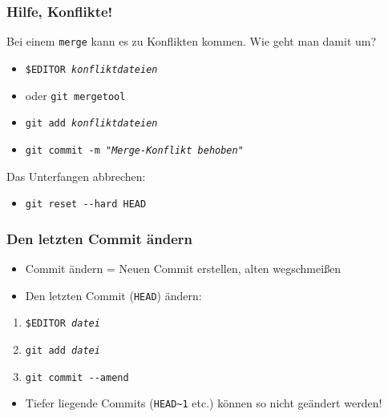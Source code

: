 \documentclass{beamer}
\begin{document}
\begin{frame}
\frametitle{Hilfe, Konflikte!}



Bei einem \texttt{merge} kann es zu Konflikten kommen. Wie geht man damit um?
\begin{itemize}
	\item \texttt{\$EDITOR \emph{konfliktdateien}}
	\item[]{ oder \texttt{git mergetool} }
	\item \texttt{git add \emph{konfliktdateien}}
	\item \texttt{git commit -m "\emph{Merge-Konflikt behoben}"}
\end{itemize}


\vspace{.5em}

Das Unterfangen abbrechen:
\begin{itemize}
	\item \texttt{git reset -{}-hard HEAD}
\end{itemize}

\end{frame}

\begin{frame}

	\frametitle{Den letzten Commit ändern}
\begin{itemize}
	\item Commit ändern = Neuen Commit erstellen, alten wegschmeißen
	\item Den letzten Commit (\texttt{HEAD}) ändern:
\end{itemize}

\begin{enumerate}
	\item \texttt{\$EDITOR \emph{datei}}
	\item \texttt{git add \emph{datei}}
	\item \texttt{git commit -{}-amend}
\end{enumerate}

\begin{itemize}
	\item Tiefer liegende Commits (\texttt{HEAD\textasciitilde{}1} etc.) können so nicht geändert werden!
\end{itemize}

\end{frame}
\end{document}
